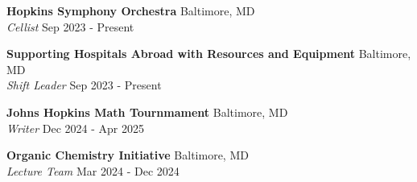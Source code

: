 \documentclass[11pt]{article}       %
\begin{document}
\vspace{5pt}

\textbf{Hopkins Symphony Orchestra} \hfill Baltimore, MD \\
\textit{Cellist} \hfill Sep 2023 - Present \\

\vspace{5pt}

\textbf{Supporting Hospitals Abroad with Resources and Equipment} \hfill Baltimore, MD \\
\textit{Shift Leader} \hfill Sep 2023 - Present \\

\vspace{5pt}

\textbf{Johns Hopkins Math Tournmament} \hfill Baltimore, MD \\
\textit{Writer} \hfill Dec 2024 - Apr 2025 \\

\vspace{5pt}

\textbf{Organic Chemistry Initiative} \hfill Baltimore, MD \\
\textit{Lecture Team} \hfill Mar 2024 - Dec 2024 \\

\vspace{-9pt}
\end{document}
